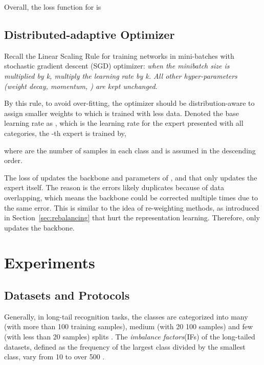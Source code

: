 \documentclass[10pt,twocolumn,letterpaper]{article}
\begin{document}
Overall, the loss function for  is


\subsection{Distributed-adaptive Optimizer}
Recall the Linear Scaling Rule \cite{goyal2017accurate} for training networks in mini-batches with stochastic gradient descent (SGD) optimizer: \textit{when the minibatch size is multiplied by k, multiply the learning rate by k. All other hyper-parameters (weight decay, momentum, \etc) are kept unchanged}. 

By this rule, to avoid over-fitting, the optimizer should be distribution-aware to assign smaller weights to  which is trained with less data. Denoted the base learning rate as , which is the learning rate for the expert presented with all categories, the -th expert is trained by,

where  are the number of samples in each class and  is assumed in the descending order. 

The loss of  updates the backbone and parameters of , and  that  only updates the expert itself. The reason is the errors likely duplicates because of data overlapping, which means the backbone could be corrected multiple times due to the same error. This is similar to the idea of re-weighting methods, as introduced in Section~\ref{sec:rebalancing} that hurt the representation learning. Therefore, only  updates the backbone.

\section{Experiments}
\subsection{Datasets and Protocols}
Generally, in long-tail recognition tasks, the classes are categorized into many (with more than 100 training samples), medium (with 20 100 samples) and few (with less than 20 samples) splits \cite{liu2019large}. The \textit{imbalance factors}(IFs) of the long-tailed datasets, defined as the frequency of the largest class divided by the smallest class, vary from 10 to over 500 \cite{cui2019class, liu2019large, van2018inaturalist}.
\end{document}
